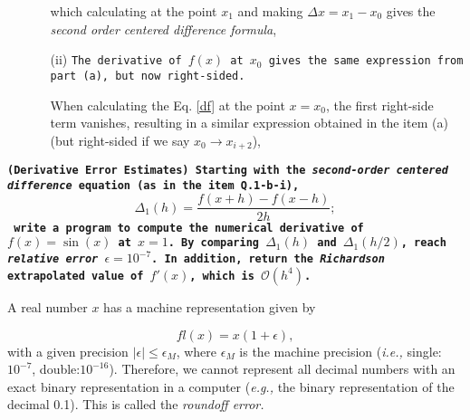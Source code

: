 \documentclass[11pt]{article}
\newcounter{question}[section]
\newcommand{\question}[2] {\vspace{.25in} \fbox{#1} #2 \vspace{.10in}}
\newcommand{\ie}{{\it i.e., }}
\newcommand{\eg}{{\it e.g., }}
\begin{document}
\begin{enumerate}
\begin{enumerate}
which calculating at the point $x_1$ and making $\Delta x = x_1 - x_0$ gives the {\it second order centered difference formula},

\quad
 
\centerline{}

\quad

\item[(ii)] {\color{MidnightBlue}\texttt{The derivative of $f(x)$ at $x_0$ gives the same expression from part (a), but now right-sided.}}

\quad

When calculating the Eq. \ref{df} at the point $x=x_0$, the first right-side term vanishes, resulting in a similar expression obtained in the item (a) (but right-sided if we say $x_0\rightarrow x_{i+2}$),

\centerline{}

\end{enumerate}
\end{enumerate}

\quad

\clearpage



{\color{MidnightBlue}
\question{Q.2}{\texttt{{\bf(Derivative Error Estimates)} {\bf  Starting with the {\it second-order centered difference} equation (as in the item Q.1-b-i),
\begin{equation}
\Delta_1(h) = \frac{f(x+h)-f(x-h)}{2h};
\label{delta1}
\end{equation}
write a program to compute the numerical derivative of $f(x)=\sin(x)$ at $x=1$. By comparing $\Delta_1(h)$ and $\Delta_1(h/2)$, reach {\it relative error} $\epsilon=10^{-7}$. In addition, return the {\it Richardson} extrapolated value of $f'(x)$, which is $\mathcal{O}(h^4)$.
}}}}

\quad

A real number $x$ has a machine representation given by

$$fl(x) = x(1+\epsilon),$$
with a given precision $|\epsilon|\leq \epsilon_M$, where  $\epsilon_M$ is the machine precision (\ie single:$10^{-7}$, double:$10^{-16}$). Therefore, we cannot represent all decimal numbers with an exact binary representation in a computer (\eg the binary representation of the decimal 0.1). This is called the {\it roundoff error.}
\end{document}
